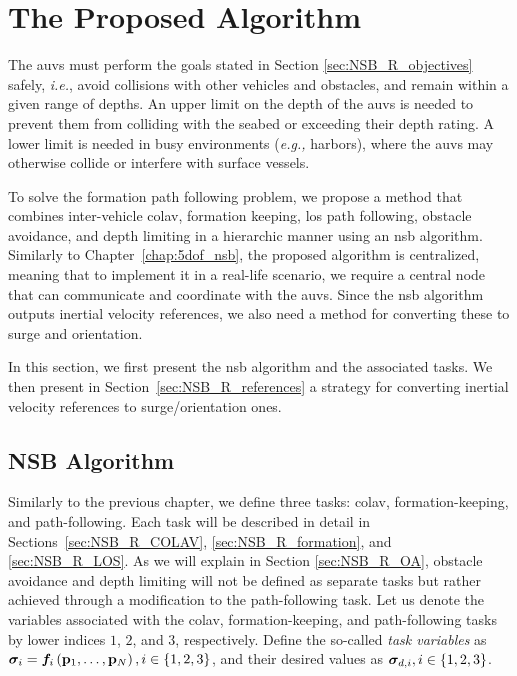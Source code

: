 \section{The Proposed Algorithm}
\label{sec:NSB_R_control}

The \glspl{auv} must perform the goals stated in Section \ref{sec:NSB_R_objectives} safely, \emph{i.e.},
avoid collisions with other vehicles and obstacles, and remain within a given range of depths.
An upper limit on the depth of the \glspl{auv} is needed to prevent them from colliding with the seabed or exceeding their depth rating.
A lower limit is needed in busy environments (\emph{e.g.,} harbors), where the \glspl{auv} may otherwise collide or interfere with surface vessels.

To solve the formation path following problem, we propose a method that combines inter-vehicle \acrfull{colav}, formation keeping, \acrfull{los} path following, obstacle avoidance, and depth limiting in a hierarchic manner using an \gls{nsb} algorithm.
Similarly to Chapter~\ref{chap:5dof_nsb}, the proposed algorithm is centralized, meaning that to implement it in a real-life scenario, we require a central node that can communicate and coordinate with the \glspl{auv}.
Since the \gls{nsb} algorithm outputs inertial velocity references, we also need a method for converting these to surge and orientation.

In this section, we first present the \gls{nsb} algorithm and the associated tasks.
We then present in Section~\ref{sec:NSB_R_references} a strategy for converting inertial velocity references to surge/orientation ones.

\subsection{NSB Algorithm}
\label{sec:NSB_R_NSB}

Similarly to the previous chapter, we define three tasks: \gls{colav}, formation-keeping, and path-following.
Each task will be described in detail in Sections~\ref{sec:NSB_R_COLAV}, \ref{sec:NSB_R_formation}, and \ref{sec:NSB_R_LOS}.
As we will explain in Section \ref{sec:NSB_R_OA}, obstacle avoidance and depth limiting will not be defined as separate tasks but rather achieved through a modification to the path-following task.
Let us denote the variables associated with the \gls{colav}, formation-keeping, and path-following tasks by lower indices $1$, $2$, and $3$, respectively.
Define the so-called \emph{task variables} as $\bm{\sigma}_i = \bm{f}_i\left(\mathbf{p}_1, \ldots, \mathbf{p}_N\right), i \in \left\{1,2,3\right\}$, and their desired values as $\bm{\sigma}_{d,i}, i \in \left\{1,2,3\right\}$.

